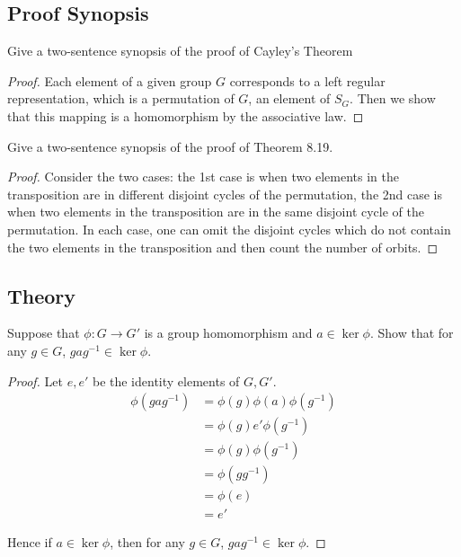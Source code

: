 \subsection*{Proof Synopsis}

\newpage
\begin{exercise}
    Give a two-sentence synopsis of the proof of Cayley's Theorem
\end{exercise}

\begin{proof}
    Each element of a given group $G$ corresponds to a left regular representation, which is a permutation of $G$, an element of $S_{G}$. Then we show that this mapping is a homomorphism by the associative law.
\end{proof}

\newpage
\begin{exercise}
    Give a two-sentence synopsis of the proof of Theorem 8.19.
\end{exercise}

\begin{proof}
    Consider the two cases: the 1st case is when two elements in the transposition are in different disjoint cycles of the permutation, the 2nd case is when two elements in the transposition are in the same disjoint cycle of the permutation. In each case, one can omit the disjoint cycles which do not contain the two elements in the transposition and then count the number of orbits.
\end{proof}

\subsection*{Theory}

\newpage
\begin{exercise}
    Suppose that $\phi: G\to G'$ is a group homomorphism and $a\in \ker\phi$. Show that for any $g\in G$, $gag^{-1}\in \ker\phi$.
\end{exercise}

\begin{proof}
    Let $e, e'$ be the identity elements of $G, G'$.
    \begin{align*}
        \phi(gag^{-1}) & = \phi(g)\phi(a)\phi(g^{-1}) \\
                       & = \phi(g)e'\phi(g^{-1})      \\
                       & = \phi(g)\phi(g^{-1})        \\
                       & = \phi(gg^{-1})              \\
                       & = \phi(e)                    \\
                       & = e'
    \end{align*}

    Hence if $a\in\ker\phi$, then for any $g\in G$, $gag^{-1}\in\ker\phi$.
\end{proof}

